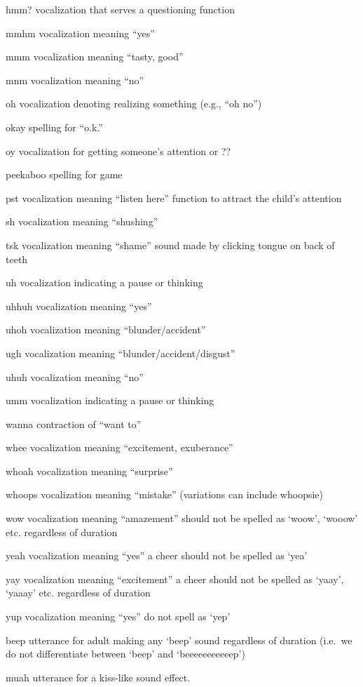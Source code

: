 \documentclass[
  12pt,
]{book}
\begin{document}
hmm?
vocalization that serves a questioning function

mmhm
vocalization meaning ``yes''

mmm
vocalization meaning ``tasty, good''

mnm
vocalization meaning ``no''

oh
vocalization denoting realizing something (e.g., ``oh no'')

okay
spelling for ``o.k.''

oy
vocalization for getting someone's attention or ??

peekaboo
spelling for game

pst
vocalization meaning ``listen here''
function to attract the child's attention

sh
vocalization meaning ``shushing''

tsk
vocalization meaning ``shame''
sound made by clicking tongue on back of teeth

uh
vocalization indicating a pause or thinking

uhhuh
vocalization meaning ``yes''

uhoh
vocalization meaning ``blunder/accident''

ugh
vocalization meaning ``blunder/accident/disgust''

uhuh
vocalization meaning ``no''

umm
vocalization indicating a pause or thinking

wanna
contraction of ``want to''

whee
vocalization meaning ``excitement, exuberance''

whoah
vocalization meaning ``surprise''

whoops
vocalization meaning ``mistake'' (variations can include whoopsie)

wow
vocalization meaning ``amazement''
should not be spelled as `woow', `wooow' etc. regardless of duration

yeah
vocalization meaning ``yes''
a cheer
should not be spelled as `yea'

yay
vocalization meaning ``excitement''
a cheer
should not be spelled as `yaay', `yaaay' etc. regardless of duration

yup
vocalization meaning ``yes''
do not spell as `yep'

beep
utterance for adult making any `beep' sound regardless of duration (i.e.~we do not differentiate between `beep' and `beeeeeeeeeeep')

muah
utterance for a kiss-like sound effect.
\end{document}
